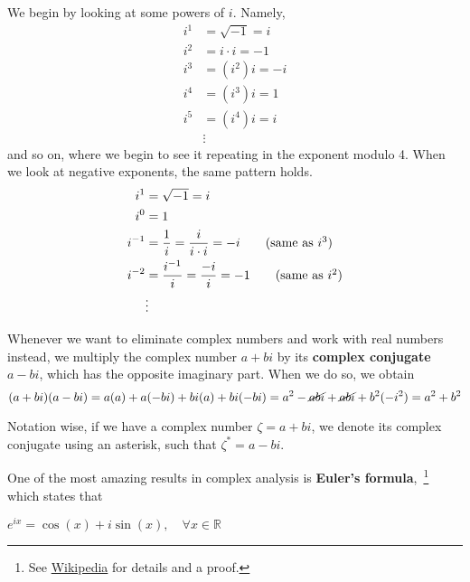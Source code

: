 We begin by looking at some powers of $i$. Namely,
\begin{align*}
i^1 &= \sqrt{-1} = i \\
i^2 &= i \cdot i = -1 \\
i^3 &= (i^2)i = -i \\
i^4 &= (i^3)i =  1 \\
i^5 &= (i^4)i = i \tag{same as $i^1$}\\
&\vdots 
\end{align*}
and so on, where we begin to see it repeating in the exponent modulo 4. When we look at negative exponents, the same pattern holds.
\begin{align*}
i^1 &= \sqrt{-1} = i \\
i^0 &= 1 \\
i^{-1} &= \dfrac{1}{i} = \dfrac{i}{i\cdot i} = -i \tag{same as $i^{3}$} \\
i^{-2} &= \dfrac{i^{-1}}{i} = \dfrac{-i}{i} = -1 \tag{same as $i^2$} \\
&\vdots 
\end{align*}

Whenever we want to eliminate complex numbers and work with real numbers instead, we multiply the complex number $a+bi$ by its \textbf{complex conjugate} $a-bi$, which has the opposite imaginary part. When we do so, we obtain 
\begin{equation*} 
(a+bi)(a-bi) = a(a) + a(-bi) + bi(a) + bi(-bi) = a^2 - \cancel{abi} + \cancel{abi} + b^2(-i^2) = a^2+b^2
\end{equation*}

Notation wise, if we have a complex number $\zeta = a + bi$, we denote its complex conjugate using an asterisk, such that $\zeta^* = a - bi$. \par

One of the most amazing results in complex analysis is \textbf{Euler's formula},~\footnote{See \href{https://en.wikipedia.org/wiki/Euler\%27s\_formula}{Wikipedia} for details and a proof.} which states that 
\begin{tcolorbox}[title=Euler's formula]
	$e^{ix} = \cos(x) + i\sin(x), \quad \forall x \in \mathbb{R}$
\end{tcolorbox}

